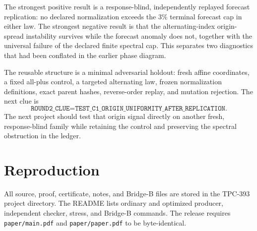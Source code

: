 \documentclass[10pt]{article}
\begin{document}
The strongest positive result is a response-blind, independently replayed
forecast replication: no declared normalization exceeds the $3\%$ terminal
forecast cap in either law.  The strongest negative result is that the
alternating-index origin-spread instability survives while the forecast
anomaly does not, together with the universal failure of the declared finite
spectral cap.  This separates two diagnostics that had been conflated in the
earlier phase diagram.

The reusable structure is a minimal adversarial holdout: fresh affine
coordinates, a fixed all-plus control, a targeted alternating law, frozen
normalization definitions, exact parent hashes, reverse-order replay, and
mutation rejection.  The next clue is
\[
 \texttt{ROUND2\_CLUE=TEST\_C1\_ORIGIN\_UNIFORMITY\_AFTER\_REPLICATION}.
\]
The next project should test that origin signal directly on another fresh,
response-blind family while retaining the control and preserving the
spectral obstruction in the ledger.

\section*{Reproduction}

All source, proof, certificate, notes, and Bridge-B files are stored in the
TPC-393 project directory.  The README lists ordinary and optimized producer,
independent checker, stress, and Bridge-B commands.  The release requires
\texttt{paper/main.pdf} and \texttt{paper/paper.pdf} to be byte-identical.
\end{document}
